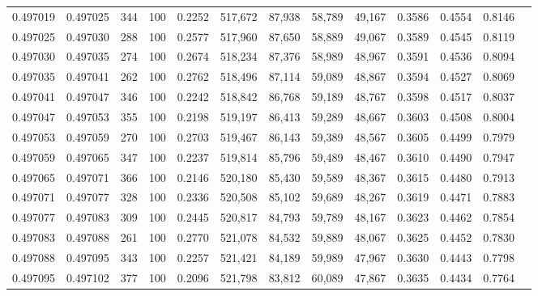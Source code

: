 \begin{tabular}{rrrrrrrrrrrrr}
0.497019 & 0.497025 &   344 & 100 &                                     0.2252 & 517,672 &  87,938 &  58,789 &  49,167 & 0.3586 & 0.4554 & 0.8146 \\
0.497025 & 0.497030 &   288 & 100 &                                     0.2577 & 517,960 &  87,650 &  58,889 &  49,067 & 0.3589 & 0.4545 & 0.8119 \\
0.497030 & 0.497035 &   274 & 100 &                                     0.2674 & 518,234 &  87,376 &  58,989 &  48,967 & 0.3591 & 0.4536 & 0.8094 \\
0.497035 & 0.497041 &   262 & 100 &                                     0.2762 & 518,496 &  87,114 &  59,089 &  48,867 & 0.3594 & 0.4527 & 0.8069 \\
0.497041 & 0.497047 &   346 & 100 &                                     0.2242 & 518,842 &  86,768 &  59,189 &  48,767 & 0.3598 & 0.4517 & 0.8037 \\
0.497047 & 0.497053 &   355 & 100 &                                     0.2198 & 519,197 &  86,413 &  59,289 &  48,667 & 0.3603 & 0.4508 & 0.8004 \\
0.497053 & 0.497059 &   270 & 100 &                                     0.2703 & 519,467 &  86,143 &  59,389 &  48,567 & 0.3605 & 0.4499 & 0.7979 \\
0.497059 & 0.497065 &   347 & 100 &                                     0.2237 & 519,814 &  85,796 &  59,489 &  48,467 & 0.3610 & 0.4490 & 0.7947 \\
0.497065 & 0.497071 &   366 & 100 &                                     0.2146 & 520,180 &  85,430 &  59,589 &  48,367 & 0.3615 & 0.4480 & 0.7913 \\
0.497071 & 0.497077 &   328 & 100 &                                     0.2336 & 520,508 &  85,102 &  59,689 &  48,267 & 0.3619 & 0.4471 & 0.7883 \\
0.497077 & 0.497083 &   309 & 100 &                                     0.2445 & 520,817 &  84,793 &  59,789 &  48,167 & 0.3623 & 0.4462 & 0.7854 \\
0.497083 & 0.497088 &   261 & 100 &                                     0.2770 & 521,078 &  84,532 &  59,889 &  48,067 & 0.3625 & 0.4452 & 0.7830 \\
0.497088 & 0.497095 &   343 & 100 &                                     0.2257 & 521,421 &  84,189 &  59,989 &  47,967 & 0.3630 & 0.4443 & 0.7798 \\
0.497095 & 0.497102 &   377 & 100 &                                     0.2096 & 521,798 &  83,812 &  60,089 &  47,867 & 0.3635 & 0.4434 & 0.7764 \\

\end{tabular}
